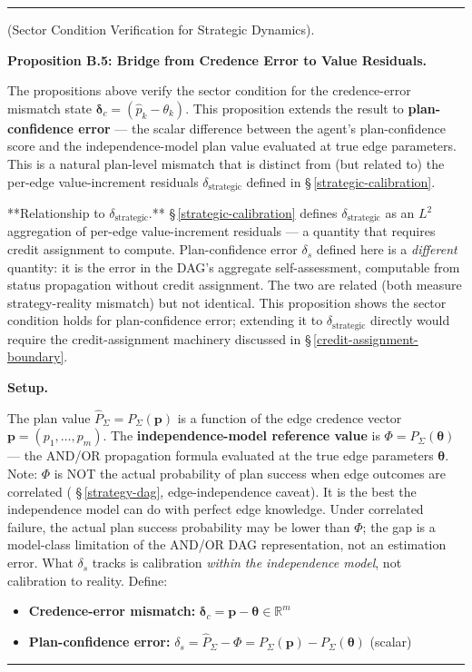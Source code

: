 \documentclass[11pt,oneside]{article}
\newcounter{claim}[section]
\renewcommand{\theclaim}{\thesection.\arabic{claim}}
\newenvironment{segment}[2]{%
  \refstepcounter{claim}%
  \bigskip\noindent\hrule\smallskip
  \noindent{\bfseries #1~\theclaim}\enskip(#2).\par\smallskip
  \noindent\ignorespaces
}{%
  \par\smallskip\noindent\hrule\bigskip
}
\newenvironment{derivation}[1][]{\begin{segment}{Derivation}{#1}}{\end{segment}}
\begin{document}
\begin{derivation}[Sector Condition Verification for Strategic Dynamics]
\medskip\noindent\textbf{Proposition B.5: Bridge from Credence Error to Value Residuals.}


The propositions above verify the sector condition for the credence-error mismatch state $\boldsymbol\delta_c = (\hat p_k - \theta_k)$. This proposition extends the result to \textbf{plan-confidence error} — the scalar difference between the agent's plan-confidence score and the independence-model plan value evaluated at true edge parameters. This is a natural plan-level mismatch that is distinct from (but related to) the per-edge value-increment residuals $\delta_{\text{strategic}}$ defined in \S\,\ref{strategic-calibration}.

**Relationship to $\delta_{\text{strategic}}$.** \S\,\ref{strategic-calibration} defines $\delta_{\text{strategic}}$ as an $L^2$ aggregation of per-edge value-increment residuals — a quantity that requires credit assignment to compute. Plan-confidence error $\delta_s$ defined here is a \textit{different} quantity: it is the error in the DAG's aggregate self-assessment, computable from status propagation without credit assignment. The two are related (both measure strategy-reality mismatch) but not identical. This proposition shows the sector condition holds for plan-confidence error; extending it to $\delta_{\text{strategic}}$ directly would require the credit-assignment machinery discussed in \S\,\ref{credit-assignment-boundary}.


\medskip\noindent\textbf{Setup.}


The plan value $\hat P_\Sigma = P_\Sigma(\mathbf{p})$ is a function of the edge credence vector $\mathbf{p} = (p_1, \ldots, p_m)$. The \textbf{independence-model reference value} is $\Phi = P_\Sigma(\boldsymbol\theta)$ — the AND/OR propagation formula evaluated at the true edge parameters $\boldsymbol\theta$. Note: $\Phi$ is NOT the actual probability of plan success when edge outcomes are correlated ( \S\,\ref{strategy-dag}, edge-independence caveat). It is the best the independence model can do with perfect edge knowledge. Under correlated failure, the actual plan success probability may be lower than $\Phi$; the gap is a model-class limitation of the AND/OR DAG representation, not an estimation error. What $\delta_s$ tracks is calibration \textit{within the independence model}, not calibration to reality. Define:

\begin{itemize}
  \item \textbf{Credence-error mismatch:} $\boldsymbol\delta_c = \mathbf{p} - \boldsymbol\theta \in \mathbb{R}^m$
  \item \textbf{Plan-confidence error:} $\delta_s = \hat P_\Sigma - \Phi = P_\Sigma(\mathbf{p}) - P_\Sigma(\boldsymbol\theta)$ (scalar)
\end{itemize}



\end{derivation}
\end{document}
